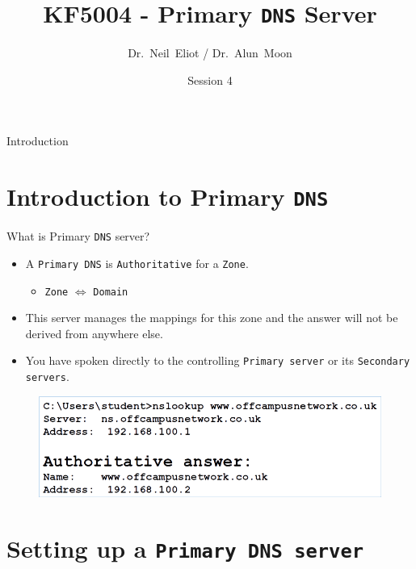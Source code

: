 \documentclass[xcolor=table]{beamer}
\title{KF5004 - Primary \texttt{DNS} Server}
\author{Dr.~Neil~Eliot\inst{1} / Dr.~Alun~Moon\inst{1}}
\institute[Northumbria University] %
{
  \inst{1}
  Department of Computer and Information Sciences\\
  University of Northumbria
}
\date{Session 4}
\begin{document}
\begin{frame}
  \titlepage
\end{frame}

\begin{frame}{Introduction}
  \tableofcontents
\end{frame}


\section{Introduction to Primary \texttt{DNS}}
\begin{frame}{What is Primary \texttt{DNS} server?}
  \begin{itemize}
    \item A \texttt{Primary DNS} is \texttt{Authoritative} for a \texttt{Zone}.
      \begin{itemize}
          \item \texttt{Zone} $\Longleftrightarrow$ \texttt{Domain}
      \end{itemize}
    \item This server manages the mappings for this zone and the answer will not be derived from anywhere else.
    \item You have spoken directly to the controlling \texttt{Primary server} or its \texttt{Secondary servers}.
  \end{itemize}
  \begin{figure}
    \begin{center}
      \includegraphics[width=0.8\linewidth]{Authoritative.png}
    \end{center}
  \end{figure}
\end{frame}

\section{Setting up a \texttt{Primary DNS server}}
\end{document}

